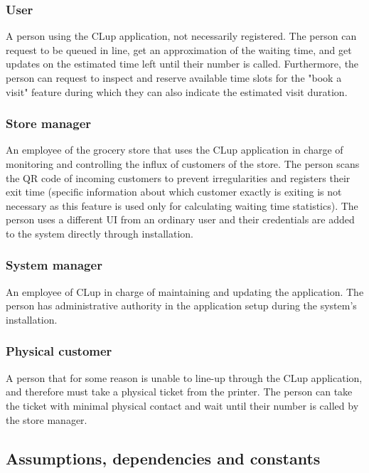 \subsubsection{User}
\hspace{\parindent}A person using the CLup application, not necessarily registered. The person can request to be queued in line, get an approximation of the waiting time, and get updates on the estimated time left until their number is called. Furthermore, the person can request to inspect and reserve available time slots for the "book a visit" feature during which they can also indicate the estimated visit duration. 
\subsubsection{Store manager}
\hspace{\parindent}An employee of the grocery store that uses the CLup application in charge of monitoring and controlling the influx of customers of the store. The person scans the QR code of incoming customers to prevent irregularities and registers their exit time (specific information about which customer exactly is exiting is not necessary as this feature is used only for calculating waiting time statistics). The person uses a different UI from an ordinary user and their credentials are added to the system directly through installation. 
\subsubsection{System manager}
\hspace{\parindent}An employee of CLup in charge of maintaining and updating the application. The person has administrative authority in the application setup during the system's installation. 
\subsubsection{Physical customer}
\hspace{\parindent}A person that for some reason is unable to line-up through the CLup application, and therefore must take a physical ticket from the printer. The person can take the ticket with minimal physical contact and wait until their number is called by the store manager. 

\newpage

\subsection{Assumptions, dependencies and constants}
